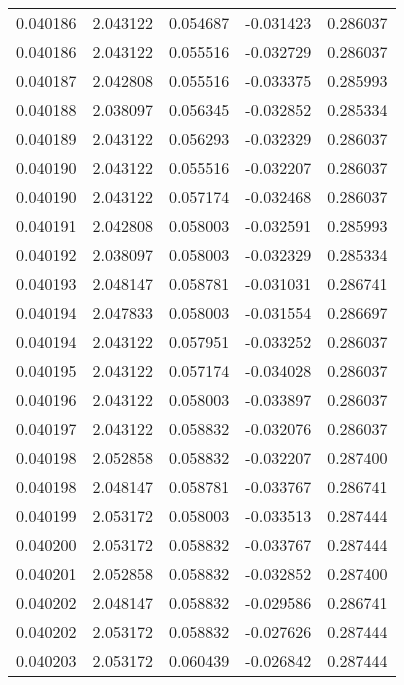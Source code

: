 \begin{tabular}{lrrrr}
0.040186    &  2.043122 &  0.054687 & -0.031423 &             0.286037 \\
0.040186    &  2.043122 &  0.055516 & -0.032729 &             0.286037 \\
0.040187    &  2.042808 &  0.055516 & -0.033375 &             0.285993 \\
0.040188    &  2.038097 &  0.056345 & -0.032852 &             0.285334 \\
0.040189    &  2.043122 &  0.056293 & -0.032329 &             0.286037 \\
0.040190    &  2.043122 &  0.055516 & -0.032207 &             0.286037 \\
0.040190    &  2.043122 &  0.057174 & -0.032468 &             0.286037 \\
0.040191    &  2.042808 &  0.058003 & -0.032591 &             0.285993 \\
0.040192    &  2.038097 &  0.058003 & -0.032329 &             0.285334 \\
0.040193    &  2.048147 &  0.058781 & -0.031031 &             0.286741 \\
0.040194    &  2.047833 &  0.058003 & -0.031554 &             0.286697 \\
0.040194    &  2.043122 &  0.057951 & -0.033252 &             0.286037 \\
0.040195    &  2.043122 &  0.057174 & -0.034028 &             0.286037 \\
0.040196    &  2.043122 &  0.058003 & -0.033897 &             0.286037 \\
0.040197    &  2.043122 &  0.058832 & -0.032076 &             0.286037 \\
0.040198    &  2.052858 &  0.058832 & -0.032207 &             0.287400 \\
0.040198    &  2.048147 &  0.058781 & -0.033767 &             0.286741 \\
0.040199    &  2.053172 &  0.058003 & -0.033513 &             0.287444 \\
0.040200    &  2.053172 &  0.058832 & -0.033767 &             0.287444 \\
0.040201    &  2.052858 &  0.058832 & -0.032852 &             0.287400 \\
0.040202    &  2.048147 &  0.058832 & -0.029586 &             0.286741 \\
0.040202    &  2.053172 &  0.058832 & -0.027626 &             0.287444 \\
0.040203    &  2.053172 &  0.060439 & -0.026842 &             0.287444 \\

\end{tabular}

